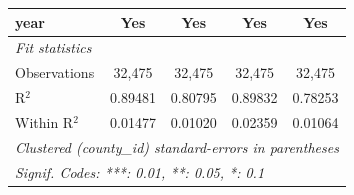 \begin{tabular}{lcccc}
   year                                            & Yes                & Yes                       & Yes                    & Yes\\  
   \midrule
   \emph{Fit statistics}\\
   Observations                                    & 32,475             & 32,475                    & 32,475                 & 32,475\\  
   R$^2$                                           & 0.89481            & 0.80795                   & 0.89832                & 0.78253\\  
   Within R$^2$                                    & 0.01477            & 0.01020                   & 0.02359                & 0.01064\\  
   \midrule \midrule
   \multicolumn{5}{l}{\emph{Clustered (county\_id) standard-errors in parentheses}}\\
   \multicolumn{5}{l}{\emph{Signif. Codes: ***: 0.01, **: 0.05, *: 0.1}}\\
\end{tabular}
\par\endgroup


